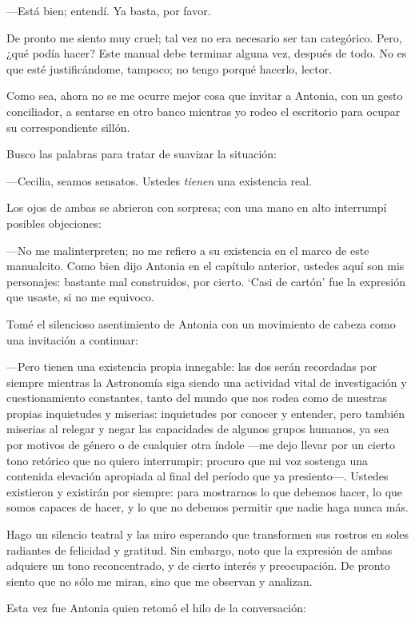 ---Está bien; entendí. Ya basta, por favor.

De pronto me siento muy cruel; tal vez no era necesario ser tan
categórico. Pero, ¿qué podía hacer? Este manual debe terminar alguna
vez, después de todo. No es que esté justificándome, tampoco; no tengo
porqué hacerlo, lector.

Como sea, ahora no se me ocurre mejor cosa que invitar a Antonia, con
un gesto conciliador, a sentarse en otro banco mientras yo rodeo el
escritorio para ocupar su correspondiente sillón.

Busco las palabras para tratar de suavizar la
situación:

---Cecilia, seamos sensatos. Ustedes \emph{tienen} una existencia
real.

Los ojos de ambas se abrieron con sorpresa; con una mano en alto
interrumpí posibles objeciones:

---No me malinterpreten; no me refiero a su existencia en el marco de
este manualcito. Como bien dijo Antonia en el capítulo anterior,
ustedes aquí son mis personajes: bastante mal construidos, por
cierto. `Casi de cartón' fue la expresión que usaste, si no me
equivoco.

Tomé el silencioso asentimiento de Antonia con un movimiento de cabeza
como una invitación a continuar:

---Pero tienen una existencia propia innegable: las dos serán recordadas
por siempre mientras la Astronomía siga siendo una actividad vital de
investigación y cuestionamiento constantes, tanto del mundo que nos
rodea como de nuestras propias inquietudes y miserias: inquietudes por
conocer y entender, pero también miserias al relegar y negar las
capacidades de algunos grupos humanos, ya sea por motivos de género o
de cualquier otra índole ---me dejo llevar por un cierto tono
retórico que no quiero interrumpir; procuro que mi voz sostenga una
contenida elevación apropiada al final del período que ya presiento---.
Ustedes existieron y existirán por siempre: para mostrarnos lo que
debemos hacer, lo que somos capaces de hacer, y lo que no debemos
permitir que nadie haga nunca más.

Hago un silencio teatral y las miro esperando que transformen sus
rostros en soles radiantes de felicidad y gratitud. Sin embargo, noto
que la expresión de ambas adquiere un tono reconcentrado, y de cierto
interés y preocupación. De pronto siento que no sólo me miran, sino
que me observan y analizan.

Esta vez fue Antonia quien retomó el hilo de la con\-ver\-sa\-ción:

